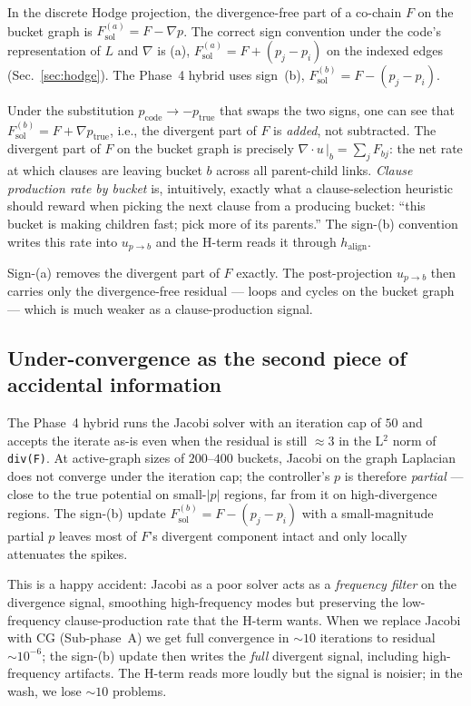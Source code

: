 \documentclass[11pt]{article}
\newcommand{\lid}[1]{{\ttfamily\nolinkurl{#1}}}
\begin{document}
In the discrete Hodge projection, the divergence-free part of a
co-chain $F$ on the bucket graph is
$F_\mathrm{sol}^{(a)} = F - \nabla p$. The correct sign convention
under the code's representation of $L$ and $\nabla$ is (a),
$F_\mathrm{sol}^{(a)} = F + (p_j - p_i)$ on the
indexed edges (Sec.~\ref{sec:hodge}). The Phase~4 hybrid uses sign~(b),
$F_\mathrm{sol}^{(b)} = F - (p_j - p_i)$.

Under the substitution $p_\mathrm{code}\to -p_\mathrm{true}$ that swaps
the two signs, one can see that
$F_\mathrm{sol}^{(b)} = F + \nabla p_\mathrm{true}$, i.e., the
divergent part of $F$ is \emph{added}, not subtracted. The divergent part
of $F$ on the bucket graph is precisely
$\nabla\!\cdot\!u\,|_b = \sum_j F_{bj}$: the net rate at which clauses
are leaving bucket $b$ across all parent-child links. \emph{Clause
production rate by bucket} is, intuitively, exactly what a clause-selection
heuristic should reward when picking the next clause from a producing
bucket: ``this bucket is making children fast; pick more of its parents.''
The sign-(b) convention writes this rate into $u_{p\to b}$ and the
H-term reads it through $h_\mathrm{align}$.

Sign-(a) removes the divergent part of $F$ exactly. The post-projection
$u_{p\to b}$ then carries only the divergence-free residual --- loops and
cycles on the bucket graph --- which is much weaker as a clause-production
signal.

\subsection{Under-convergence as the second piece of accidental information}

The Phase~4 hybrid runs the Jacobi solver with an iteration cap of $50$
and accepts the iterate as-is even when the residual is still
$\approx 3$ in the L${}^2$ norm of \lid{div(F)}. At active-graph sizes
of $200$--$400$ buckets, Jacobi on the graph Laplacian does not converge
under the iteration cap; the controller's $p$ is therefore
\emph{partial} --- close to the true potential on small-$|p|$ regions,
far from it on high-divergence regions. The sign-(b) update
$F_\mathrm{sol}^{(b)} = F - (p_j - p_i)$ with a small-magnitude partial
$p$ leaves most of $F$'s divergent component intact and only locally
attenuates the spikes.

This is a happy accident: Jacobi as a poor solver acts as a
\emph{frequency filter} on the divergence signal, smoothing high-frequency
modes but preserving the low-frequency clause-production rate that the
H-term wants. When we replace Jacobi with CG (Sub-phase~A) we get full
convergence in $\sim 10$ iterations to residual $\sim 10^{-6}$; the
sign-(b) update then writes the \emph{full} divergent signal, including
high-frequency artifacts. The H-term reads more loudly but the signal is
noisier; in the wash, we lose $\sim 10$ problems.
\end{document}
